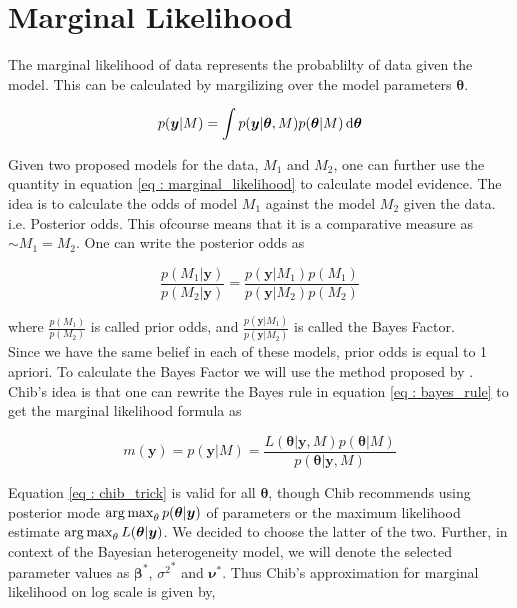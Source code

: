 \section{Marginal Likelihood}
\label{sec : marginal_likelihood}

The marginal likelihood of data represents the probablilty of data given the model. This can be calculated by margilizing over the model parameters $\boldsymbol{\theta}$. 

\begin{equation}
\label{eq : marginal_likelihood}
p(\boldsymbol{y}|M) = \int p(\boldsymbol{y}|\boldsymbol{\theta}, M) p(\boldsymbol{\theta}|M) \mathop{}\!\mathrm{d} \boldsymbol{\theta}
\end{equation}

Given two proposed models for the data, $M_1$ and $M_2$, one can further use the quantity in equation \ref{eq : marginal_likelihood} to calculate model evidence. The idea is to calculate the odds of model $M_1$ against the model $M_2$ given the data. i.e. Posterior odds. This ofcourse means that it is a comparative measure as $\sim M_1 = M_2$. One can write the posterior odds as

$$\frac {p(M_1|\boldsymbol{y})}{p(M_2|\boldsymbol{y})} = \frac {p(\boldsymbol{y}|M_1) p(M_1)} {p(\boldsymbol{y}|M_2) p(M_2)}$$

where $\frac {p(M_1)}{p(M_2)}$ is called prior odds, and $\frac {p(\boldsymbol{y}|M_1)} {p(\boldsymbol{y}|M_2)}$ is called the Bayes Factor.\\

Since we have the same belief in each of these models, prior odds is equal to 1 apriori. To calculate the Bayes Factor we will use the method proposed by \citet{chib_marginal_1995}. Chib's idea is that one can rewrite the Bayes rule in equation \ref{eq : bayes_rule} to get the marginal likelihood formula as

\begin{equation}
\label{eq : chib_trick}
m(\boldsymbol{y}) = p(\boldsymbol{y}|M) = \dfrac {L(\boldsymbol{\theta}|\boldsymbol{y}, M) p(\boldsymbol{\theta}|M)} {p(\boldsymbol{\theta}|\boldsymbol{y}, M)}
\end{equation}

Equation \ref{eq : chib_trick} is valid for all $\boldsymbol{\theta}$, though Chib recommends using posterior mode $\operatorname*{arg\,max}_\theta p(\boldsymbol{\theta}|\boldsymbol{y})$ of parameters or the maximum likelihood estimate $\operatorname*{arg\,max}_\theta L(\boldsymbol{\theta}|\boldsymbol{y})$. We decided to choose the latter of the two. Further, in context of the Bayesian heterogeneity model, we will denote the selected parameter values as ${\boldsymbol{\beta}}^*$, ${\sigma^2}^*$ and $\boldsymbol{\nu}^*$. Thus Chib's approximation for marginal likelihood on log scale is given by,

